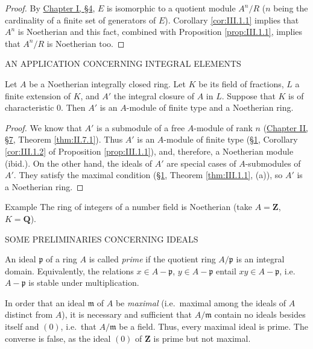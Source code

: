 \begin{proof}
By \hyperref[sec:1.4]{Chapter I, §4}, $E$ is isomorphic to a quotient module $A^{n}/R$ ($n$
being the cardinality of a finite set of generators of $E$). Corollary
\ref{cor:III.1.1} implies that $A^{n}$ is Noetherian and this fact, combined
with Proposition \ref{prop:III.1.1}, implies that $A^{n}/R$ is Noetherian
too.
\end{proof}

%
        {AN APPLICATION CONCERNING INTEGRAL ELEMENTS}

\begin{proposition}
\label{prop:III.2.1}
Let $A$ be a Noetherian integrally closed ring. Let $K$ be its field of
fractions, $L$ a finite extension of $K$, and $A'$ the integral closure of
$A$ in $L$. Suppose that $K$ is of characteristic $0$. Then $A'$ is an
$A$-module of finite type and a Noetherian ring.
\end{proposition}

\begin{proof}
We know that $A'$ is a submodule of a free $A$-module of rank $n$
(\hyperref[sec:2.7]{Chapter II, §7}, Theorem \ref{thm:II.7.1}). Thus $A'$ is an $A$-module of
finite type (\hyperref[sec:3.1]{§1}, Corollary \ref{cor:III.1.2} of Proposition
\ref{prop:III.1.1}), and, therefore, a Noetherian module (ibid.). On the
other hand, the ideals of $A'$ are special cases of $A$-submodules of $A'$.
They satisfy the maximal condition (\hyperref[sec:3.1]{§1}, Theorem \ref{thm:III.1.1}, (a)), so
$A'$ is a Noetherian ring.
\end{proof}

\begin{statement}{Example}
The ring of integers of a number field is Noetherian (take
$A=\mathbf{Z}$, $K=\mathbf{Q}$).
\end{statement}

%
        {SOME PRELIMINARIES CONCERNING IDEALS}

An ideal $\mathfrak{p}$ of a ring $A$ is called \emph{prime} if the quotient
ring $A/\mathfrak{p}$ is an integral domain. Equivalently, the relations
$x\in A-\mathfrak{p}$, $y\in A-\mathfrak{p}$ entail
$xy\in A-\mathfrak{p}$, i.e.\ $A-\mathfrak{p}$ is stable under
multiplication.

In order that an ideal $\mathfrak{m}$ of $A$ be \emph{maximal} (i.e.\ maximal
among the ideals of $A$ distinct from $A$), it is necessary and sufficient
that $A/\mathfrak{m}$ contain no ideals besides itself and $(0)$, i.e.\ that
$A/\mathfrak{m}$ be a field. Thus, every maximal ideal is prime. The converse
is false, as the ideal $(0)$ of $\mathbf{Z}$ is prime but not maximal.

